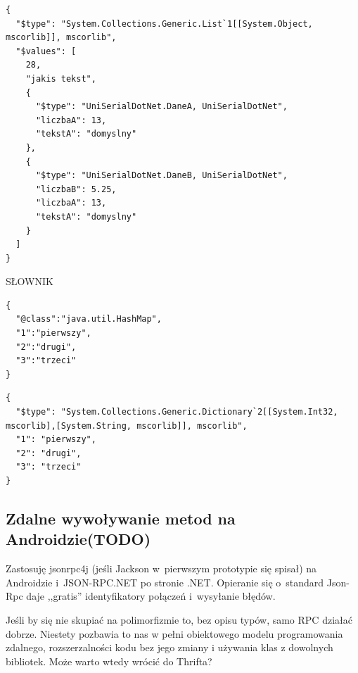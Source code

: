 \begin{lstlisting}[float, frame=single, caption={JSON.NET daje. Lista}, label=kod:json-net-list-serilization]
{
  "$type": "System.Collections.Generic.List`1[[System.Object, mscorlib]], mscorlib",
  "$values": [
    28,
    "jakis tekst",
    {
      "$type": "UniSerialDotNet.DaneA, UniSerialDotNet",
      "liczbaA": 13,
      "tekstA": "domyslny"
    },
    {
      "$type": "UniSerialDotNet.DaneB, UniSerialDotNet",
      "liczbaB": 5.25,
      "liczbaA": 13,
      "tekstA": "domyslny"
    }
  ]
}
\end{lstlisting}

SŁOWNIK
\begin{lstlisting}[float, frame=single, caption={Jackson daje. Słownik}, label=kod:jackson-dict-serilization]
{
  "@class":"java.util.HashMap",
  "1":"pierwszy",
  "2":"drugi",
  "3":"trzeci"
}
\end{lstlisting}


\begin{lstlisting}[float, frame=single, caption={JSON.NET daje. Słownik}, label=kod:json-net-dict-serilization]
{
  "$type": "System.Collections.Generic.Dictionary`2[[System.Int32, mscorlib],[System.String, mscorlib]], mscorlib",
  "1": "pierwszy",
  "2": "drugi",
  "3": "trzeci"
}
\end{lstlisting}


\subsection{Zdalne wywoływanie metod na Androidzie(TODO)}
Zastosuję jsonrpc4j (jeśli Jackson w~pierwszym prototypie się spisał) na Androidzie i~JSON-RPC.NET po stronie .NET\@.
Opieranie się o~standard Json-Rpc daje ,,gratis'' identyfikatory połączeń i~wysyłanie błędów.

Jeśli by się nie skupiać na polimorfizmie to, bez opisu typów, samo RPC działać dobrze. Niestety pozbawia to nas w pełni obiektowego modelu programowania zdalnego, rozszerzalności kodu bez jego zmiany i używania klas z dowolnych bibliotek. Może warto wtedy wrócić do Thrifta? 

